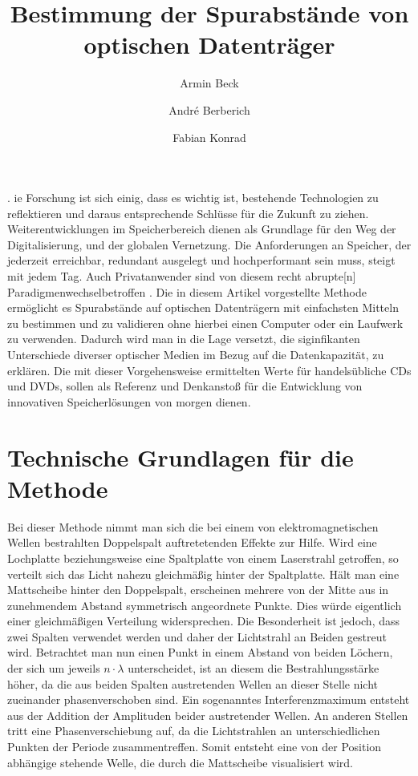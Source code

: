 \documentclass[9pt,twocolumn,twoside]{pnas-new}
\title{Bestimmung der Spurabstände von optischen Datenträger}
\author[a]{Armin Beck}
\author[a]{André Berberich}
\author[a]{Fabian Konrad}
\affil[a]{Student der DHBW Mosbach}
\begin{document}
\verticaladjustment{-2pt}

\maketitle
\thispagestyle{firststyle}
.
ie Forschung ist sich einig, dass es wichtig ist, bestehende Technologien zu reflektieren und daraus entsprechende Schlüsse für die Zukunft zu ziehen. Weiterentwicklungen im Speicherbereich dienen als Grundlage für den Weg der Digitalisierung, und der globalen Vernetzung. 
Die Anforderungen an Speicher, der jederzeit erreichbar, redundant ausgelegt und hochperformant sein muss, steigt mit jedem Tag.
Auch Privatanwender sind von diesem \glqq recht abrupte[n] Paradigmenwechsel\grqq \space betroffen \cite[Heft 10/2012 S.102]{CT1990}.
Die in diesem Artikel vorgestellte Methode ermöglicht es Spurabstände auf optischen Datenträgern mit einfachsten Mitteln zu bestimmen und zu validieren ohne hierbei einen Computer oder ein Laufwerk zu verwenden. Dadurch wird man in die Lage versetzt, die siginfikanten Unterschiede diverser optischer Medien im Bezug auf die Datenkapazität, zu erklären.
Die mit dieser Vorgehensweise ermittelten Werte für handelsübliche CDs und DVDs, sollen als Referenz und Denkanstoß für die Entwicklung von innovativen Speicherlösungen von morgen dienen.

\section*{Technische Grundlagen für die Methode}
Bei dieser Methode nimmt man sich die bei einem von elektromagnetischen Wellen bestrahlten Doppelspalt auftretetenden Effekte zur Hilfe. Wird eine Lochplatte beziehungsweise eine Spaltplatte von einem Laserstrahl getroffen, so verteilt sich das Licht nahezu gleichmäßig hinter der Spaltplatte. Hält man eine Mattscheibe hinter den Doppelspalt, erscheinen mehrere von der Mitte aus in zunehmendem Abstand symmetrisch angeordnete Punkte. Dies würde eigentlich einer gleichmäßigen Verteilung widersprechen. Die Besonderheit ist jedoch, dass zwei Spalten verwendet werden und daher der Lichtstrahl an Beiden gestreut wird. Betrachtet man nun einen Punkt in einem Abstand von beiden Löchern, der sich um jeweils \begin{math}n\cdot\lambda\end{math} unterscheidet, ist an diesem die Bestrahlungsstärke höher, da die aus beiden Spalten austretenden Wellen an dieser Stelle nicht zueinander phasenverschoben sind. Ein sogenanntes Interferenzmaximum entsteht aus der Addition der Amplituden beider austretender Wellen. An anderen Stellen tritt eine Phasenverschiebung auf, da die Lichtstrahlen an unterschiedlichen Punkten der Periode zusammentreffen. Somit entsteht eine von der Position abhängige stehende Welle, die durch die Mattscheibe visualisiert wird.
\end{document}
